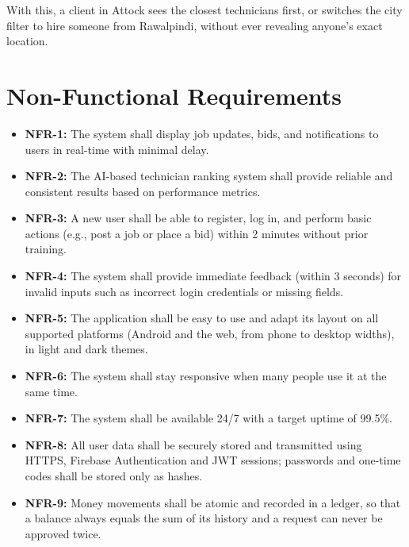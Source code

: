 \documentclass[A4paper,12pt]{report}
\theoremstyle{plain}
\theoremstyle{definition}
\theoremstyle{remark}
\numberwithin{equation}{section}
\begin{document}
With this, a client in Attock sees the closest technicians first, or switches the city filter to hire someone from Rawalpindi, without ever revealing anyone's exact location.








\section{Non-Functional Requirements}
\begin{itemize}
    \item \textbf{NFR-1:} The system shall display job updates, bids, and notifications to users in real-time with minimal delay.
    
    \item \textbf{NFR-2:} The AI-based technician ranking system shall provide reliable and consistent results based on performance metrics.
    
    \item \textbf{NFR-3:} A new user shall be able to register, log in, and perform basic actions (e.g., post a job or place a bid) within 2 minutes without prior training.
    
    \item \textbf{NFR-4:} The system shall provide immediate feedback (within 3 seconds) for invalid inputs such as incorrect login credentials or missing fields.
    
        \item \textbf{NFR-5:} The application shall be easy to use and adapt its layout on all supported platforms (Android and the web, from phone to desktop widths), in light and dark themes.
    
    \item \textbf{NFR-6:} The system shall stay responsive when many people use it at the same time.
    
    \item \textbf{NFR-7:} The system shall be available 24/7 with a target uptime of 99.5\%.
    
        \item \textbf{NFR-8:} All user data shall be securely stored and transmitted using HTTPS, Firebase Authentication and JWT sessions; passwords and one-time codes shall be stored only as hashes.
    \item \textbf{NFR-9:} Money movements shall be atomic and recorded in a ledger, so that a balance always equals the sum of its history and a request can never be approved twice.
\end{itemize}
\end{document}
